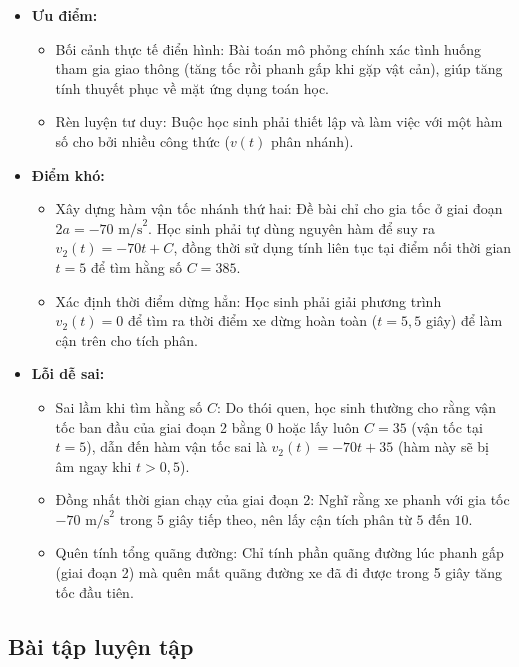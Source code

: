 \documentclass[12pt,a4paper,oneside]{book}
\theoremstyle{theorem}
\theoremstyle{definition}
\begin{document}
\begin{itemize}
    \item \textbf{Ưu điểm:} 
    \begin{itemize}
    \item Bối cảnh thực tế điển hình: Bài toán mô phỏng chính xác tình huống tham gia giao thông (tăng tốc rồi phanh gấp khi gặp vật cản), giúp tăng tính thuyết phục về mặt ứng dụng toán học.
    \item Rèn luyện tư duy: Buộc học sinh phải thiết lập và làm việc với một hàm số cho bởi nhiều công thức ($v(t)$ phân nhánh).
    \end{itemize}
    \item \textbf{Điểm khó:}
    \begin{itemize}
        \item Xây dựng hàm vận tốc nhánh thứ hai: Đề bài chỉ cho gia tốc ở giai đoạn 2$a = -70 \text{ m/s}^2$. Học sinh phải tự dùng nguyên hàm để suy ra $v_2(t) = -70t + C$, đồng thời sử dụng tính liên tục tại điểm nối thời gian $t = 5$ để tìm hằng số $C = 385$.
        \item Xác định thời điểm dừng hẳn: Học sinh phải giải phương trình $v_2(t) = 0$ để tìm ra thời điểm xe dừng hoàn toàn ($t = 5,5$ giây) để làm cận trên cho tích phân.
    \end{itemize}
    \item \textbf{Lỗi dễ sai:}
    \begin{itemize}
        \item Sai lầm khi tìm hằng số $C$: Do thói quen, học sinh thường cho rằng vận tốc ban đầu của giai đoạn 2 bằng 0 hoặc lấy luôn $C = 35$ (vận tốc tại $t=5$), dẫn đến hàm vận tốc sai là $v_2(t) = -70t + 35$ (hàm này sẽ bị âm ngay khi $t > 0,5$).
        \item Đồng nhất thời gian chạy của giai đoạn 2: Nghĩ rằng xe phanh với gia tốc $-70 \text{ m/s}^2$ trong $5$ giây tiếp theo, nên lấy cận tích phân từ $5$ đến $10$.
        \item Quên tính tổng quãng đường: Chỉ tính phần quãng đường lúc phanh gấp (giai đoạn 2) mà quên mất quãng đường xe đã đi được trong 5 giây tăng tốc đầu tiên.
    \end{itemize}
\end{itemize}
\subsection{Bài tập luyện tập}
\end{document}
